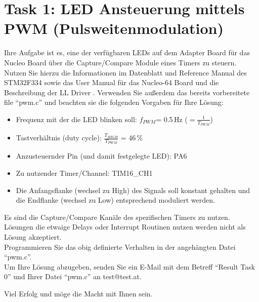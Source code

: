 \documentclass[a4paper,12pt]{article}
\begin{document}
\pagestyle{empty}
\setlength{\parindent}{0em}
\section*{Task 1: LED Ansteuerung mittels PWM (Pulsweitenmodulation)}

Ihre Aufgabe ist es, eine der verfügbaren LEDs auf dem Adapter Board für das Nucleo Board über die Capture/Compare Module eines Timers zu steuern. Nutzen Sie hierzu die Informationen im Datenblatt \cite{data_sheet} und Reference Manual \cite{ref_manual} des STM32F334 sowie das User Manual für das Nucleo-64 Board \cite{nucleo_manual} und die Beschreibung der LL Driver \cite{driver_manual}. Verwenden Sie außerdem das bereits vorbereitete file \enquote{pwm.c} und beachten sie die folgenden Vorgaben für Ihre Lösung:

\begin{itemize}
\item Frequenz mit der die LED blinken soll: $f_{PWM}$= 0.5\,Hz ($=\frac{1}{T_{PWM}}$)
\item Tastverh\"altnis (duty cycle):  $\frac{T_{HIGH}}{T_{PWM}}$ = 46\,\%
\item Anzusteuernder Pin (und damit festgelegte LED): PA6
\item Zu nutzender Timer/Channel: TIM16_CH1
\item Die Anfangsflanke (wechsel zu High) des Signals soll konstant gehalten und die Endflanke (wechsel zu Low) entsprechend moduliert werden.
\end{itemize}
\vspace{0.3cm}

Es sind die Capture/Compare Kanäle des spezifischen Timers zu nutzen. Lösungen die etwaige Delays oder Interrupt Routinen nutzen werden nicht als Lösung akzeptiert.
\\



Programmieren Sie das obig definierte Verhalten in der angeh\"angten Datei \enquote{pwm.c}.
\\

Um Ihre L\"osung abzugeben, senden Sie ein E-Mail mit dem Betreff \enquote{Result Task 0} und Ihrer Datei \enquote{pwm.c}  an test@test.at.

\vspace{0.7cm}

Viel Erfolg und m\"oge die Macht mit Ihnen sein.

\printbibliography[heading=bibintoc]
\end{document}
